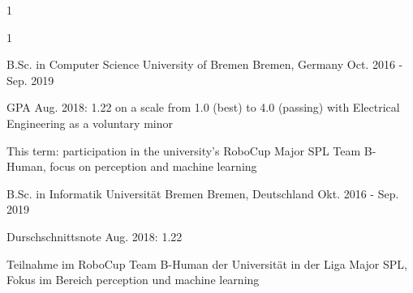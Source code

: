 \multilang
  {1}
  {}
  {}


\begin{cventries}

\multilang
  {1}
  {\cventry
    {B.Sc. in Computer Science} %
    {University of Bremen} %
    {Bremen, Germany} %
    {Oct. 2016 - Sep. 2019} %
    {
      \begin{cvitems} %
        \item {GPA Aug. 2018: 1.22 on a scale from 1.0 (best) to 4.0 (passing) with Electrical Engineering as a voluntary minor}
        \item {This term: participation in the university's RoboCup Major SPL Team B-Human, focus on perception and machine learning}
      \end{cvitems}
    }
  }{\cventry
    {B.Sc. in Informatik} %
    {Universität Bremen} %
    {Bremen, Deutschland} %
    {Okt. 2016 - Sep. 2019} %
    {
      \begin{cvitems} %
        \item {Durschschnittsnote Aug. 2018: 1.22}
        \item {Teilnahme im RoboCup Team B-Human der Universität in der Liga Major SPL, Fokus im Bereich perception und machine learning}
      \end{cvitems}
    }
  }
    

\end{cventries}
